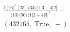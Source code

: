 \documentclass[varwidth, border=5pt]{standalone}
\begin{document}
\begin{my}
$\begin{gathered}
\scriptscriptstyle\frac{1⟨16⟩^2[23]⟨34⟩⟨1|3+4|2]}{⟨13⟩⟨56⟩⟨1|2+4|3]^3}+\\
\scriptscriptstyle(432165,\;\text{True},\;-)\phantom{+}
\end{gathered}$
\end{my}
\end{document}
